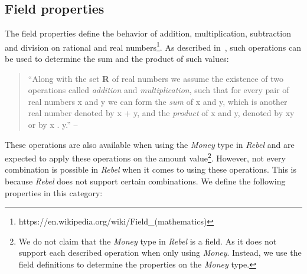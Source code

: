 \subsection{Field properties}
\label{ssct:properties_definitions_fieldproperties}
The field properties define the behavior of addition, multiplication, subtraction and division on rational and real numbers\footnote{https://en.wikipedia.org/wiki/Field_(mathematics)}. As described
in~\cite{apostol2007calculus}, such operations can be used to determine the sum and the product of such values:
\begin{quote}
	``Along with the set \textbf{R} of real numbers we assume the existence of two operations called
	\textit{addition} and \textit{multiplication}, such that for every pair of real numbers x and y we can form the
	\textit{sum} of x and y, which is another real number denoted by x + y, and the \textit{product} of x and y,
	denoted by xy or by x . y.''
	-- ~\cite{apostol2007calculus}
\end{quote}
These operations are also available
when using the \textit{Money} type in \textit{Rebel} and are expected to apply
these operations on the amount value\footnote{We do not claim that the \textit{Money} type in \textit{Rebel} is a field. As it does not support each described operation when only using \textit{Money}. Instead, we use the field definitions to determine the properties on the \textit{Money} type.}. However, not every combination is possible
in \textit{Rebel} when it comes to using these operations. This is because \textit{Rebel} does not support certain combinations. We define the following properties in this category:

